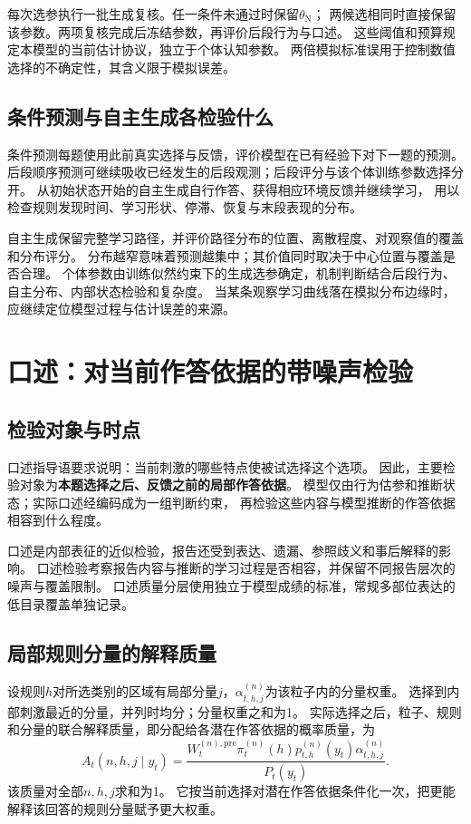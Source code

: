 \documentclass[11pt,a4paper]{article}
\numberwithin{equation}{section}
\begin{document}
每次选参执行一批生成复核。任一条件未通过时保留$\theta_{\mathrm N}$；
两候选相同时直接保留该参数。两项复核完成后冻结参数，再评价后段行为与口述。
这些阈值和预算规定本模型的当前估计协议，独立于个体认知参数。
两倍模拟标准误用于控制数值选择的不确定性，其含义限于模拟误差。

\subsection{条件预测与自主生成各检验什么}
条件预测每题使用此前真实选择与反馈，评价模型在已有经验下对下一题的预测。
后段顺序预测可继续吸收已经发生的后段观测；后段评分与该个体训练参数选择分开。
从初始状态开始的自主生成自行作答、获得相应环境反馈并继续学习，
用以检查规则发现时间、学习形状、停滞、恢复与末段表现的分布。

自主生成保留完整学习路径，并评价路径分布的位置、离散程度、对观察值的覆盖和分布评分。
分布越窄意味着预测越集中；其价值同时取决于中心位置与覆盖是否合理。
个体参数由训练似然约束下的生成选参确定，机制判断结合后段行为、自主分布、内部状态检验和复杂度。
当某条观察学习曲线落在模拟分布边缘时，应继续定位模型过程与估计误差的来源。

\section{口述：对当前作答依据的带噪声检验}
\label{sec:oral}

\subsection{检验对象与时点}
口述指导语要求说明：当前刺激的哪些特点使被试选择这个选项。
因此，主要检验对象为\textbf{本题选择之后、反馈之前的局部作答依据}。
模型仅由行为估参和推断状态；实际口述经编码成为一组判断约束，
再检验这些内容与模型推断的作答依据相容到什么程度。

口述是内部表征的近似检验，报告还受到表达、遗漏、参照歧义和事后解释的影响。
口述检验考察报告内容与推断的学习过程是否相容，并保留不同报告层次的噪声与覆盖限制。
口述质量分层使用独立于模型成绩的标准，常规多部位表达的低目录覆盖单独记录。

\subsection{局部规则分量的解释质量}
设规则$h$对所选类别的区域有局部分量$j$，$\alpha_{t,h,j}^{(n)}$为该粒子内的分量权重。
选择到内部刺激最近的分量，并列时均分；分量权重之和为1。
实际选择之后，粒子、规则和分量的联合解释质量，即分配给各潜在作答依据的概率质量，为
\begin{equation}
A_t(n,h,j\mid y_t)=
\frac{W_t^{(n),\mathrm{pre}}\pi_t^{(n)}(h)p_{t,h}^{(n)}(y_t)
\alpha_{t,h,j}^{(n)}}{P_t(y_t)}.
\label{eq:oral-responsibility}
\end{equation}
该质量对全部$n,h,j$求和为1。
它按当前选择对潜在作答依据条件化一次，把更能解释该回答的规则分量赋予更大权重。
\end{document}

